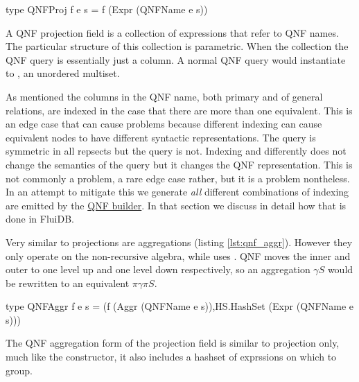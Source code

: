 \begin{code}
  \begin{haskellcode}
    type QNFProj f e s = f (Expr (QNFName e s))
  \end{haskellcode}
  \caption{\label{lst:qnf_proj}A QNF projection field is a collection of
    expressions that refer to QNF names. The particular structure of
    this collection is parametric. When the collection 
    the QNF query is essentially just a column. A normal QNF query
    would instantiate  to , an unordered
    multiset.}
\end{code}

As mentioned the columns in the QNF name, both primary and of general
relations, are indexed in the case that there are more than one
equivalent. This is an edge case that can cause problems because
different indexing can cause equivalent nodes to have different
syntactic representations. The query  is symmetric in all repsects but the query
 is
not. Indexing  and  differently does not change the
semantics of the query but it changes the QNF representation. This is
not commonly a problem, a rare edge case rather, but it is a problem
nontheless. In an attempt to mitigate this we generate \emph{all}
different combinations of indexing are emitted by the
\hyperref[sec:org3f1036f]{QNF builder}. In that section we discuss in
detail how that is done in FluiDB.

Very similar to projections are aggregations (listing
\ref{lst:qnf_aggr}). However they only operate on the non-recursive
 algebra, while  uses . QNF moves the inner and outer  to one level up and
one level down respectively, so an aggregation \(\gamma S\) would be
rewritten to an equivalent \(\pi \gamma \pi S\).

\begin{code}
  \begin{haskellcode}
    type QNFAggr f e s =
    (f (Aggr (QNFName e s)),HS.HashSet (Expr (QNFName e s)))
  \end{haskellcode}
  \label{lst:qnf_aggr}
  \caption{The QNF aggregation form of the projection field is similar
    to projection only, much like the  constructor, it
    also includes a hashset of exprssions on which to group.}
\end{code}

